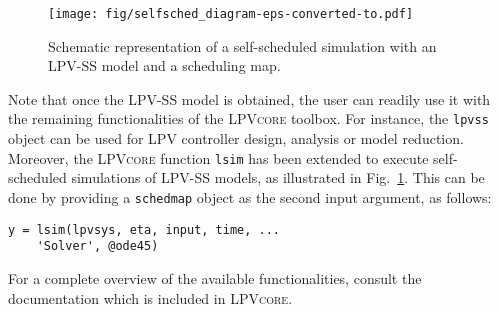 \begin{figure}[t]
    \centering
    \texttt{[image: fig/selfsched\_diagram-eps-converted-to.pdf]}
    \caption{Schematic representation of a self-scheduled simulation with an LPV-SS model and a scheduling map.}
    \label{fig:selfsched_diagram}
\end{figure}
Note that once the LPV-SS model is obtained, the user can readily use it with the remaining functionalities of the \textsc{LPVcore} toolbox. For instance, the \lstinline{lpvss} object can be used for LPV controller design, analysis or model reduction. Moreover, the \textsc{LPVcore} function \lstinline{lsim} has been extended to execute self-scheduled simulations of LPV-SS models, as illustrated in Fig.~\ref{fig:selfsched_diagram}. This can be done by providing a \lstinline{schedmap} object as the second input argument, as follows:
\begin{lstlisting}[basicstyle=\ttfamily]
y = lsim(lpvsys, eta, input, time, ...
    'Solver', @ode45)
\end{lstlisting}
For a complete overview of the available functionalities, consult the documentation which is included in \textsc{LPVcore}.




